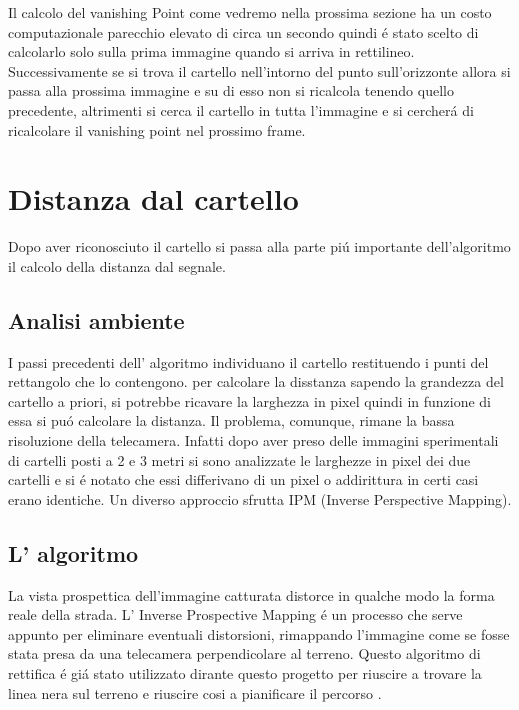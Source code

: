 		Il calcolo del vanishing Point come vedremo nella prossima sezione ha un costo computazionale parecchio elevato di circa un secondo quindi \'e stato scelto di calcolarlo solo sulla prima immagine quando si arriva in rettilineo. Successivamente se si trova il cartello nell'intorno del punto sull'orizzonte allora si passa alla prossima immagine e su di esso non si ricalcola tenendo quello precedente, altrimenti si cerca il cartello in tutta l'immagine e si cercher\'a di ricalcolare il vanishing point nel prossimo frame.

\section{Distanza dal cartello}
	
	Dopo aver riconosciuto il cartello si passa alla parte pi\'u importante dell'algoritmo il calcolo della distanza dal segnale.

	\subsection{Analisi ambiente}

		I passi precedenti dell' algoritmo individuano il cartello restituendo i punti del rettangolo che lo contengono. per calcolare la disstanza sapendo la grandezza del cartello a priori, si potrebbe ricavare la larghezza in pixel quindi in funzione di essa si pu\'o calcolare la distanza. Il problema, comunque, rimane la bassa risoluzione della telecamera. Infatti dopo aver preso delle immagini sperimentali di cartelli posti a 2 e 3 metri si sono analizzate le larghezze in pixel dei due cartelli e si \'e notato che essi differivano di un pixel o addirittura in certi casi erano identiche. Un diverso approccio sfrutta IPM (Inverse Perspective Mapping).
		
	\subsection{L' algoritmo}

		La vista prospettica dell'immagine catturata distorce in qualche modo la forma reale della strada. L' Inverse Prospective Mapping \'e un processo che serve appunto per eliminare eventuali distorsioni, rimappando l'immagine come se fosse stata presa da una telecamera perpendicolare al terreno. Questo algoritmo di rettifica \'e gi\'a stato utilizzato dirante questo progetto per riuscire a trovare la linea nera sul terreno e riuscire cosi a pianificare il percorso \cite{Rettifica}.

